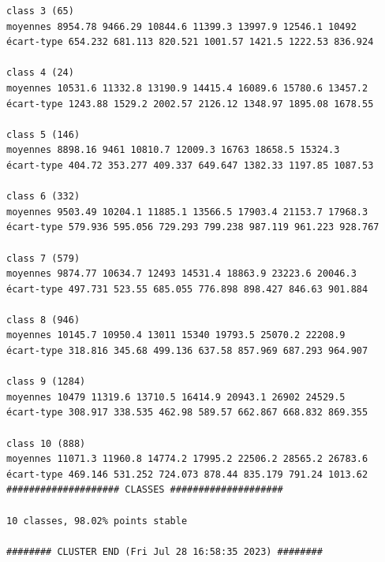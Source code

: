 \documentclass[earth,article,submit,pdftex,moreauthors]{Definitions/mdpi}
\begin{document}
\begin{scriptsize}
\begin{verbatim}
class 3 (65)
moyennes 8954.78 9466.29 10844.6 11399.3 13997.9 12546.1 10492
écart-type 654.232 681.113 820.521 1001.57 1421.5 1222.53 836.924

class 4 (24)
moyennes 10531.6 11332.8 13190.9 14415.4 16089.6 15780.6 13457.2
écart-type 1243.88 1529.2 2002.57 2126.12 1348.97 1895.08 1678.55

class 5 (146)
moyennes 8898.16 9461 10810.7 12009.3 16763 18658.5 15324.3
écart-type 404.72 353.277 409.337 649.647 1382.33 1197.85 1087.53

class 6 (332)
moyennes 9503.49 10204.1 11885.1 13566.5 17903.4 21153.7 17968.3
écart-type 579.936 595.056 729.293 799.238 987.119 961.223 928.767

class 7 (579)
moyennes 9874.77 10634.7 12493 14531.4 18863.9 23223.6 20046.3
écart-type 497.731 523.55 685.055 776.898 898.427 846.63 901.884

class 8 (946)
moyennes 10145.7 10950.4 13011 15340 19793.5 25070.2 22208.9
écart-type 318.816 345.68 499.136 637.58 857.969 687.293 964.907

class 9 (1284)
moyennes 10479 11319.6 13710.5 16414.9 20943.1 26902 24529.5
écart-type 308.917 338.535 462.98 589.57 662.867 668.832 869.355

class 10 (888)
moyennes 11071.3 11960.8 14774.2 17995.2 22506.2 28565.2 26783.6
écart-type 469.146 531.252 724.073 878.44 835.179 791.24 1013.62
#################### CLASSES ####################

10 classes, 98.02% points stable

######## CLUSTER END (Fri Jul 28 16:58:35 2023) ########

\end{verbatim}
\end{scriptsize}
\end{document}
